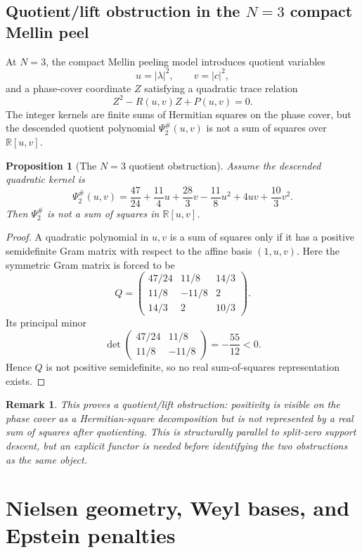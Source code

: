 \documentclass[11pt]{amsart}
\newtheorem{proposition}[theorem]{Proposition}
\newtheorem{remark}[theorem]{Remark}
\newcommand{\RR}{\mathbb R}
\begin{document}
\subsection{Quotient/lift obstruction in the $N=3$ compact Mellin peel}

At $N=3$, the compact Mellin peeling model \cite{compactmellin} introduces quotient variables
\[
       u=|\lambda|^2,
       \qquad
       v=|c|^2,
\]
and a phase-cover coordinate $Z$ satisfying a quadratic trace relation
\[
       Z^2-R(u,v)Z+P(u,v)=0.
\]
The integer kernels are finite sums of Hermitian squares on the phase cover, but the descended quotient polynomial $\Psi_2^\#(u,v)$ is not a sum of squares over $\RR[u,v]$.

\begin{proposition}[The $N=3$ quotient obstruction]
Assume the descended quadratic kernel is
\[
\Psi_2^\#(u,v)=
\frac{47}{24}+\frac{11}{4}u+\frac{28}{3}v-\frac{11}{8}u^2+4uv+\frac{10}{3}v^2.
\]
Then $\Psi_2^\#$ is not a sum of squares in $\RR[u,v]$.
\end{proposition}

\begin{proof}
A quadratic polynomial in $u,v$ is a sum of squares only if it has a positive semidefinite Gram matrix with respect to the affine basis $(1,u,v)$.  Here the symmetric Gram matrix is forced to be
\[
       Q=
       \begin{pmatrix}
       47/24&11/8&14/3\\
       11/8&-11/8&2\\
       14/3&2&10/3
       \end{pmatrix}.
\]
Its principal minor
\[
       \det\begin{pmatrix}47/24&11/8\\11/8&-11/8\end{pmatrix}
       =-\frac{55}{12}<0.
\]
Hence $Q$ is not positive semidefinite, so no real sum-of-squares representation exists.\end{proof}

\begin{remark}
This proves a quotient/lift obstruction: positivity is visible on the phase cover as a Hermitian-square decomposition but is not represented by a real sum of squares after quotienting.  This is structurally parallel to split-zero support descent, but an explicit functor is needed before identifying the two obstructions as the same object.
\end{remark}

\section{Nielsen geometry, Weyl bases, and Epstein penalties}
\end{document}
